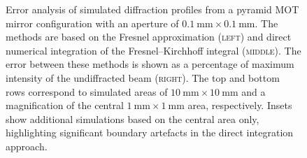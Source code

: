 \documentclass[../Thesis-IJspeert.tex]{subfiles}
\begin{document}
\begin{figure}[t]
	
	\caption[Error analysis of simulated diffraction profiles from a pyramid MOT mirror configuration]{Error analysis of simulated diffraction profiles from a pyramid MOT mirror configuration with an aperture of $\SI{0.1}{\milli\meter}\times\SI{0.1}{\milli\meter}$. The methods are based on the Fresnel approximation \textsc{(left)} and direct numerical integration of the Fresnel--Kirchhoff integral \textsc{(middle)}. The error between these methods is shown as a percentage of maximum intensity of the undiffracted beam \textsc{(right)}. The top and bottom rows correspond to simulated areas of $\SI{10}{\milli\meter}\times\SI{10}{\milli\meter}$ and a magnification of the central $\SI{1}{\milli\meter}\times\SI{1}{\milli\meter}$ area, respectively. Insets show additional simulations based on the central area only, highlighting significant boundary artefacts in the direct integration approach.}
	\label{differror}
\end{figure}
\end{document}
